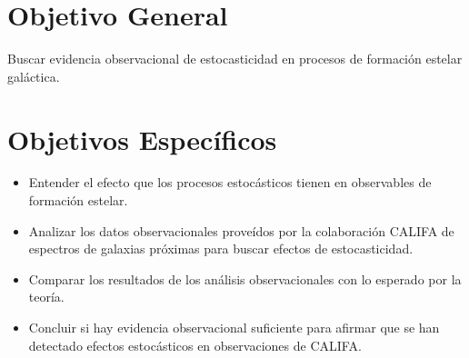 \documentclass[12pt]{article}
\begin{document}






\section{Objetivo General}

Buscar evidencia observacional de estocasticidad en procesos de
formaci\'on estelar gal\'actica.




\section{Objetivos Espec\'ificos}


\begin{itemize}
	\item Entender el efecto que los procesos estoc\'asticos
          tienen en observables de formaci\'on estelar.
	\item Analizar los datos observacionales prove\'idos por la
          colaboraci\'on CALIFA de espectros de galaxias pr\'oximas
          para buscar efectos de estocasticidad. 
	\item Comparar los resultados de los an\'alisis
          observacionales con lo esperado por la teor\'ia.
        \item Concluir si hay evidencia observacional suficiente para
          afirmar que se han detectado efectos estoc\'asticos en
          observaciones de CALIFA.
\end{itemize}
\end{document}
